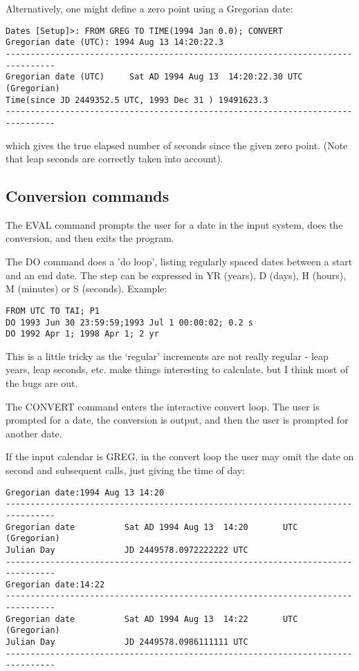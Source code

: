 \documentclass{article}
\begin{document}
Alternatively, one might define a zero point using a Gregorian date:
\begin{verbatim}
Dates [Setup]>: FROM GREG TO TIME(1994 Jan 0.0); CONVERT
Gregorian date (UTC): 1994 Aug 13 14:20:22.3
--------------------------------------------------------------------------------
Gregorian date (UTC)     Sat AD 1994 Aug 13  14:20:22.30 UTC (Gregorian)
Time(since JD 2449352.5 UTC, 1993 Dec 31 ) 19491623.3
--------------------------------------------------------------------------------
\end{verbatim}
which gives the true elapsed number of seconds since the given zero
point. (Note that leap seconds are correctly taken into account).


\subsection{Conversion commands}

The EVAL command prompts the user for a date in the input
system, does the conversion, and then exits the program.

The DO command does a 'do loop', listing regularly spaced
dates between a start and an end date. The step can be expressed
in YR (years), D (days), H (hours), M (minutes) or S (seconds).
Example:
\begin{verbatim}
FROM UTC TO TAI; P1
DO 1993 Jun 30 23:59:59;1993 Jul 1 00:00:02; 0.2 s
DO 1992 Apr 1; 1998 Apr 1; 2 yr
\end{verbatim}
This is a little tricky as the `regular' increments are
not really regular - leap years, leap seconds, etc. make
things interesting to calculate, but I think most of the
bugs are out.

The CONVERT command enters the interactive convert loop. The user
is prompted for a date, the conversion is output, and then
the user is prompted for another date.

If the input calendar is GREG, in the convert loop the
user may omit the date on second and subsequent calls,
just giving the time of day:
\begin{verbatim}
Gregorian date:1994 Aug 13 14:20
--------------------------------------------------------------------------------
Gregorian date          Sat AD 1994 Aug 13  14:20       UTC (Gregorian)
Julian Day              JD 2449578.0972222222 UTC
--------------------------------------------------------------------------------
Gregorian date:14:22
--------------------------------------------------------------------------------
Gregorian date          Sat AD 1994 Aug 13  14:22       UTC (Gregorian)
Julian Day              JD 2449578.0986111111 UTC
--------------------------------------------------------------------------------
\end{verbatim}
\end{document}
